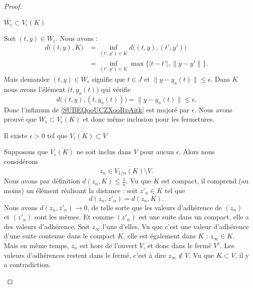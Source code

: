 \begin{proof}
    \begin{subproof}
    \item[\( \overline{ W_{\epsilon} }\subset \overline{  V_{\epsilon}(K) }\)]

        Soit \( (t,y)\in W_{\epsilon}\). Nous avons :
        \begin{subequations}
            \begin{align}
                d\big( (t,y),K \big)&=\inf_{(t',y')\in K}d\big( (t,y),(t',y') \big)\\
                &=\inf_{(t',y')\in K}\max\{ | t-t' |,\| y-y' \| \}.     \label{SUBEQooUCZXooRpAitk}
            \end{align}
        \end{subequations}
        Mais demander \( (t,y)\in W_{\epsilon}\) signifie que \( t\in J\) et \( \| y-y_a(t) \|\leq \epsilon\). Dans \( K \) nous avons l'élément \( \big( t,y_a(t) \big)\) qui vérifie
        \begin{equation}
            d\big( (t,y),(t,y_a(t)) \big)=\| y-y_a(t) \|\leq \epsilon.
        \end{equation}
        Donc l'infimum de \eqref{SUBEQooUCZXooRpAitk} est majoré par \( \epsilon\). Nous avons prouvé que \( W_{\epsilon}\subset V_{\epsilon}(K)\) et donc même inclusion pour les fermetures.

    \item[Il existe \( \epsilon>0\) tel que \( \overline{ V_{\epsilon}(K) }\subset V\)]

        Supposons que \( \overline{ V_{\epsilon}(K) }\) ne soit inclus dans \( V\) pour aucun \( \epsilon\). Alors nous considérons 
        \begin{equation}
            z_n\in \overline{ V_{1/n}(K) }\setminus V.
        \end{equation}
        Nous avons par définition \( d(z_n,K)\leq \frac{1}{ n }\). Vu que \( K\) est compact, il comprend (au moins) un élément réalisant la distance : soit \( z'_n\in K\) tel que
        \begin{equation}
            d(z_n,z'_n)=d(z_n,K).
        \end{equation}
        Nous avons \( d(z_n,z'_n)\to 0\), de telle sorte que les valeurs d'adhérence de \( (z_n)\) et \( (z'_n)\) sont les mêmes. Et comme \( (z'_n)\) est une suite dans un compact, elle a des valeurs d'adhérence. Soit \( z_{\infty}\) l'une d'elles. Vu que c'est une valeur d'adhérence d'une suite contenue dans le compact \( K\), elle est également dans \( K\) : \( z_{\infty}\in K\). Mais en même temps, \( z_n\) est hors de l'ouvert \( V\), et donc dans le fermé \( V^c\). Les valeurs d'adhérences restent dans le fermé, c'est à dire \( z_{\infty}\notin V\). Vu que \( K\subset V\), il y a contradiction.


\end{subproof}
\end{proof}

